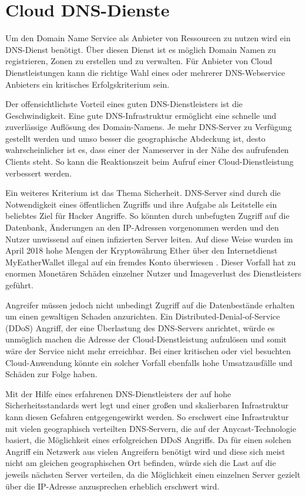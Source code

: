 \section{Cloud DNS-Dienste}
Um den Domain Name Service als Anbieter von Ressourcen zu nutzen wird ein DNS-Dienst benötigt. Über diesen Dienst ist es möglich Domain Namen zu registrieren, Zonen zu erstellen und zu verwalten. Für Anbieter von Cloud Dienstleistungen kann die richtige Wahl eines oder mehrerer DNS-Webservice Anbieters ein kritisches Erfolgskriterium sein.

Der offensichtlichste Vorteil eines guten DNS-Dienstleisters ist die Geschwindigkeit. Eine gute DNS-Infrastruktur ermöglicht eine schnelle und zuverlässige Auflösung des Domain-Namens. Je mehr DNS-Server zu Verfügung gestellt werden und umso besser die geographische Abdeckung ist, desto wahrscheinlicher ist es, dass einer der Nameserver in der Nähe des aufrufenden Clients steht. So kann die Reaktionszeit beim Aufruf einer Cloud-Dienstleistung verbessert werden. \cite{Stratusly.2017}

Ein weiteres Kriterium ist das Thema Sicherheit. DNS-Server sind durch die Notwendigkeit eines öffentlichen Zugriffs und ihre Aufgabe als Leitstelle ein beliebtes Ziel für Hacker Angriffe. So könnten durch unbefugten Zugriff auf die Datenbank, Änderungen an den IP-Adressen vorgenommen werden und den Nutzer unwissend auf einen infizierten Server leiten. Auf diese Weise wurden im April 2018 hohe Mengen der Kryptowährung Ether über den Internetdienst MyEatherWallet illegal auf ein fremdes Konto überwiesen \cite{MEWForce.2018}. Dieser Vorfall hat zu enormen Monetären Schäden einzelner Nutzer und Imageverlust des Dienstleisters geführt. \cite{ZDNet.2018}

Angreifer müssen jedoch nicht unbedingt Zugriff auf die Datenbestände erhalten um einen gewaltigen Schaden anzurichten. Ein Distributed-Denial-of-Service (DDoS) Angriff, der eine Überlastung des DNS-Servers anrichtet, würde es unmöglich machen die Adresse der Cloud-Dienstleistung aufzulösen und somit wäre der Service nicht mehr erreichbar. Bei einer kritischen oder viel besuchten Cloud-Anwendung könnte ein solcher Vorfall ebenfalls hohe Umsatzausfälle und Schäden zur Folge haben.

Mit der Hilfe eines erfahrenen DNS-Dienstleisters der auf hohe Sicherheitsstandards wert legt und einer großen und skalierbaren Infrastruktur kann diesen Gefahren entgegengewirkt werden. So erschwert eine Infrastruktur mit vielen geographisch verteilten DNS-Servern, die auf der Anycast-Technologie basiert, die Möglichkeit eines erfolgreichen DDoS Angriffs. Da für einen solchen Angriff ein Netzwerk aus vielen Angreifern benötigt wird und diese sich meist nicht am gleichen geographischen Ort befinden, würde sich die Last auf die jeweils nächsten Server verteilen, da die Möglichkeit einen einzelnen Server gezielt über die IP-Adresse anzusprechen erheblich erschwert wird. \cite{Moura.2016}

